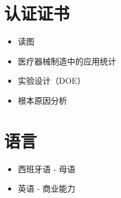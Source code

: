 \documentclass[a4paper,10pt]{article}
\begin{document}
\section*{ 认证证书}
\begin{itemize}[label=]
    \item 读图
    \item 医疗器械制造中的应用统计
    \item 实验设计（DOE）
    \item 根本原因分析
\end{itemize}

\section*{ 语言}
\begin{itemize}[label=]
    \item 西班牙语 - 母语
    \item 英语 - 商业能力
\end{itemize}

\end{document}
